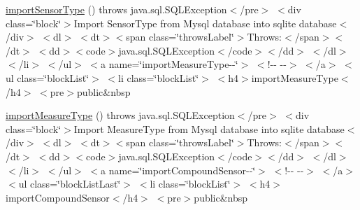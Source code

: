 \begin{DoxyCompactItemize}
\item 
\hyperlink{_my_s_q_l_connector_8html_a3a7e8873c1714482592e84c2ccb3c913}{import\-Sensor\-Type} ()  throws java.\-sql.\-S\-Q\-L\-Exception$<$/pre$>$ $<$div class=\char`\"{}block\char`\"{}$>$\-Import Sensor\-Type from Mysql database into sqlite database$<$/div$>$ $<$dl$>$ $<$dt$>$$<$span class=\char`\"{}throws\-Label\char`\"{}$>$\-Throws\-:$<$/span$>$$<$/dt$>$ $<$dd$>$$<$code$>$java.\-sql.\-S\-Q\-L\-Exception$<$/code$>$$<$/dd$>$ $<$/dl$>$ $<$/li$>$ $<$/ul$>$ $<$a name=\char`\"{}import\-Measure\-Type-\/-\/\char`\"{}$>$ $<$!-\/-\/   -\/-\/$>$ $<$/a$>$ $<$ul class=\char`\"{}block\-List\char`\"{}$>$ $<$li class=\char`\"{}block\-List\char`\"{}$>$ $<$h4$>$import\-Measure\-Type$<$/h4$>$ $<$pre$>$public\&nbsp
\item 
\hyperlink{_my_s_q_l_connector_8html_ace48462a5e3eaeded79bec22a1909caf}{import\-Measure\-Type} ()  throws java.\-sql.\-S\-Q\-L\-Exception$<$/pre$>$ $<$div class=\char`\"{}block\char`\"{}$>$\-Import Measure\-Type from Mysql database into sqlite database$<$/div$>$ $<$dl$>$ $<$dt$>$$<$span class=\char`\"{}throws\-Label\char`\"{}$>$\-Throws\-:$<$/span$>$$<$/dt$>$ $<$dd$>$$<$code$>$java.\-sql.\-S\-Q\-L\-Exception$<$/code$>$$<$/dd$>$ $<$/dl$>$ $<$/li$>$ $<$/ul$>$ $<$a name=\char`\"{}import\-Compound\-Sensor-\/-\/\char`\"{}$>$ $<$!-\/-\/   -\/-\/$>$ $<$/a$>$ $<$ul class=\char`\"{}block\-List\-Last\char`\"{}$>$ $<$li class=\char`\"{}block\-List\char`\"{}$>$ $<$h4$>$import\-Compound\-Sensor$<$/h4$>$ $<$pre$>$public\&nbsp
\item 

\end{DoxyCompactItemize}
